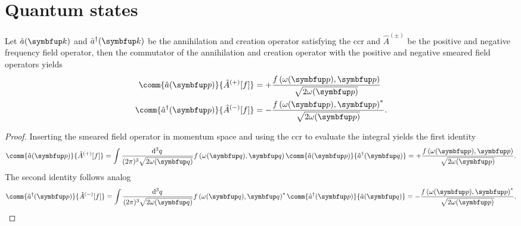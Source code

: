 \section{Quantum states}

\begin{lemma}\label{th:annihilation_field_commutators}
	Let $\hat{a}(\vb{k})$ and $\hat{a}^\dagger(\vb{k})$ be the annihilation and creation operator satisfying the \gls{ccr} and $\hat{A}^{(\pm)}$ be the positive and negative frequency field operator, then the commutator of the annihilation and creation operator with the positive and negative smeared field operators yields
	\begin{align}
		\comm{\hat{a}(\vb{p})}{\hat{A}^{(+)}[f]}
		&=
		+\frac{f\left(\omega(\vb{p}),\vb{p}\right)}{\sqrt{2\omega(\vb{p})}}
		\\
		\comm{\hat{a}^\dagger(\vb{p})}{\hat{A}^{(-)}[f]}
		&=
		-\frac{f\left(\omega(\vb{p}),\vb{p}\right)^*}{\sqrt{2\omega(\vb{p})}}
		.
	\end{align}
\end{lemma}
\begin{proof}
	Inserting the smeared field operator in momentum space and using the \gls{ccr} to evaluate the integral yields the first identity
	\begin{equation}
		\comm{\hat{a}(\vb{p})}{\hat{A}^{(+)}[f]}
		=
		\int\frac{\dd[3]{q}}{(2\pi)^3\sqrt{2\omega(\vb{q})}}
		f\left(\omega(\vb{q}),\vb{q}\right)
		\comm{\hat{a}(\vb{p})}{\hat{a}^\dagger(\vb{q})}
		=
		+\frac{f\left(\omega(\vb{p}),\vb{p}\right)}{\sqrt{2\omega(\vb{p})}}
		.
	\end{equation}
	The second identity follows analog
	\begin{equation}
		\comm{\hat{a}^\dagger(\vb{p})}{\hat{A}^{(-)}[f]}
		=
		\int\frac{\dd[3]{q}}{(2\pi)^3\sqrt{2\omega(\vb{q})}}
		f\left(\omega(\vb{q}),\vb{q}\right)^*
		\comm{\hat{a}^\dagger(\vb{p})}{\hat{a}(\vb{q})}
		=
		-\frac{f\left(\omega(\vb{p}),\vb{p}\right)^*}{\sqrt{2\omega(\vb{p})}}
		.
	\end{equation}
\end{proof}

